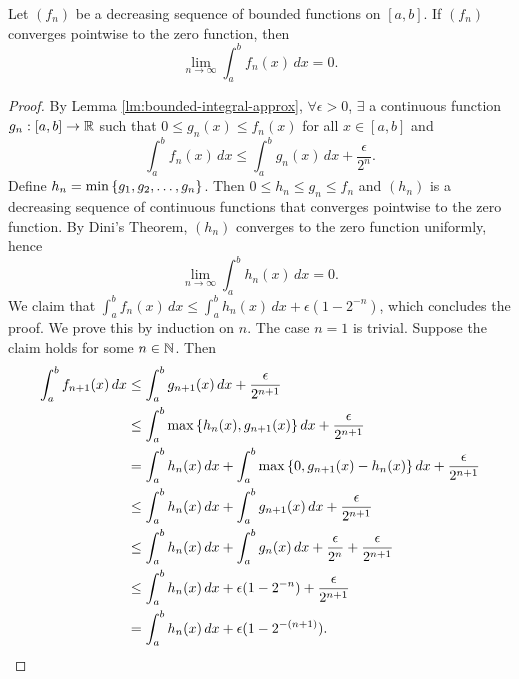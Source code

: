\begin{lm}
    Let $(f_n)$ be a decreasing sequence of bounded functions on $[a, b]$. If $(f_n)$ converges pointwise to the zero function, then
    \[
    \lim_{n \to \infty} \int_a^b f_n(x) \, dx = 0.
    \]
    \begin{proof}
        By Lemma \ref{lm:bounded-integral-approx}, $\forall \epsilon > 0$, $\exists$ a continuous function $g_n: [a, b] \to {\mathbb R}$ such that $0 \leq g_n(x) \leq f_n(x)$ for all $x \in [a, b]$ and
        \[
        \int_a^b f_n(x) \, dx \leq \int_a^b g_n(x) \, dx + \frac{\epsilon}{2^n}.
        \]
        Define $h_n = \min{\left\{{g_1, g_2, \ldots, g_n}\right\}}$. Then $0 \leq h_n \leq g_n \leq f_n$ and $(h_n)$ is a decreasing sequence of continuous functions that converges pointwise to the zero function. By Dini's Theorem, $(h_n)$ converges to the zero function uniformly, hence
        \[
        \lim_{n \to \infty} \int_a^b h_n(x) \, dx = 0.
        \]
        We claim that $\int_a^b f_n(x) \, dx \leq \int_a^b h_n(x) \, dx + \epsilon(1 - 2^{-n})$, which concludes the proof. We prove this by induction on $n$. The case $n = 1$ is trivial. Suppose the claim holds for some $n \in {\mathbb N}$. Then
        \begin{align*}
            \int_a^b f_{n+1}(x) \, dx &\leq \int_a^b g_{n+1}(x) \, dx + \frac{\epsilon}{2^{n+1}} \\
            &\leq \int_a^b \max{\left\{{h_n(x), g_{n+1}(x)}\right\}} \, dx + \frac{\epsilon}{2^{n+1}} \\
            &= \int_a^b h_n(x) \, dx + \int_a^b \max{\left\{{0, g_{n+1}(x) - h_n(x)}\right\}} \, dx + \frac{\epsilon}{2^{n+1}} \\
            &\leq \int_a^b h_n(x) \, dx + \int_a^b g_{n+1}(x) \, dx + \frac{\epsilon}{2^{n+1}} \\
            &\leq \int_a^b h_n(x) \, dx + \int_a^b g_n(x) \, dx + \frac{\epsilon}{2^n} + \frac{\epsilon}{2^{n+1}} \\
            &\leq \int_a^b h_n(x) \, dx + \epsilon(1 - 2^{-n}) + \frac{\epsilon}{2^{n+1}} \\
            &= \int_a^b h_n(x) \, dx + \epsilon(1 - 2^{-(n+1)}).
        \end{align*}
    \end{proof}
\end{lm}

